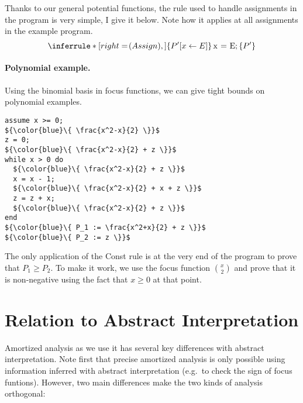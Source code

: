 \documentclass[nocopyrightspace,preprint]{sigplanconf-pldi15}
\begin{document}
Thanks to our general potential functions, the rule used to
handle assignments in the program is very simple, I give it below.
Note how it applies at all assignments in the example program.
$$
\Rule{Assign}
{ }
{\htriple{P'[x \gets E]}{\lstinline{x = E;}}{P'}}
$$

\paragraph{Polynomial example.} Using the binomial basis in
focus functions, we can give tight bounds on polynomial
examples.

\begin{lstlisting}[mathescape]
assume x >= 0;
${\color{blue}\{ \frac{x^2-x}{2} \}}$
z = 0;
${\color{blue}\{ \frac{x^2-x}{2} + z \}}$
while x > 0 do
  ${\color{blue}\{ \frac{x^2-x}{2} + z \}}$
  x = x - 1;
  ${\color{blue}\{ \frac{x^2-x}{2} + x + z \}}$
  z = z + x;
  ${\color{blue}\{ \frac{x^2-x}{2} + z \}}$
end
${\color{blue}\{ P_1 := \frac{x^2+x}{2} + z \}}$
${\color{blue}\{ P_2 := z \}}$
\end{lstlisting}

The only application of the {\sc Const} rule is at the very
end of the program to prove that $P_1 \ge P_2$.  To make it
work, we use the focus function $\binom{x}{2}$ and prove that
it is non-negative using the fact that $x \ge 0$ at that point.

\section{Relation to Abstract Interpretation}

Amortized analysis as we use it has several key differences
with abstract interpretation.  Note first that precise amortized
analysis is only possible using information inferred with abstract
interpretation (e.g.\ to check the sign of focus funtions).
However, two main differences make the two kinds of analysis
orthogonal:
\end{document}
